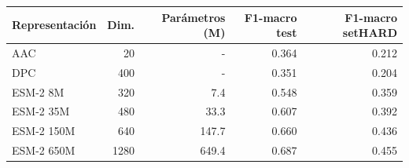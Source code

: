 \begin{tabular}{lrrrr}
\toprule
Representación & Dim. & Parámetros (M) & F1-macro test & F1-macro setHARD \\
\midrule
AAC & 20 & - & 0.364 & 0.212 \\
DPC & 400 & - & 0.351 & 0.204 \\
ESM-2 8M & 320 & 7.4 & 0.548 & 0.359 \\
ESM-2 35M & 480 & 33.3 & 0.607 & 0.392 \\
ESM-2 150M & 640 & 147.7 & 0.660 & 0.436 \\
ESM-2 650M & 1280 & 649.4 & 0.687 & 0.455 \\
\bottomrule
\end{tabular}
